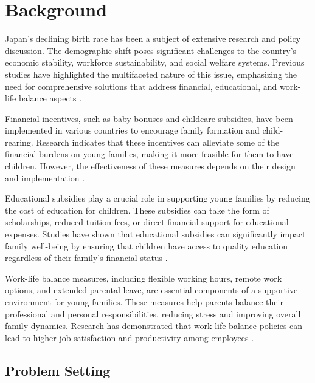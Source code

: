 \documentclass{article} %
\begin{document}
\section{Background}
\label{sec:background}

Japan's declining birth rate has been a subject of extensive research and policy discussion. The demographic shift poses significant challenges to the country's economic stability, workforce sustainability, and social welfare systems. Previous studies have highlighted the multifaceted nature of this issue, emphasizing the need for comprehensive solutions that address financial, educational, and work-life balance aspects \citep{poledna2023economic}.

Financial incentives, such as baby bonuses and childcare subsidies, have been implemented in various countries to encourage family formation and child-rearing. Research indicates that these incentives can alleviate some of the financial burdens on young families, making it more feasible for them to have children. However, the effectiveness of these measures depends on their design and implementation \citep{zhou2023peer}.

Educational subsidies play a crucial role in supporting young families by reducing the cost of education for children. These subsidies can take the form of scholarships, reduced tuition fees, or direct financial support for educational expenses. Studies have shown that educational subsidies can significantly impact family well-being by ensuring that children have access to quality education regardless of their family's financial status \citep{west2023agent}.

Work-life balance measures, including flexible working hours, remote work options, and extended parental leave, are essential components of a supportive environment for young families. These measures help parents balance their professional and personal responsibilities, reducing stress and improving overall family dynamics. Research has demonstrated that work-life balance policies can lead to higher job satisfaction and productivity among employees \citep{shanahan2023role}.

\subsection{Problem Setting}
\label{sec:problem_setting}
\end{document}
